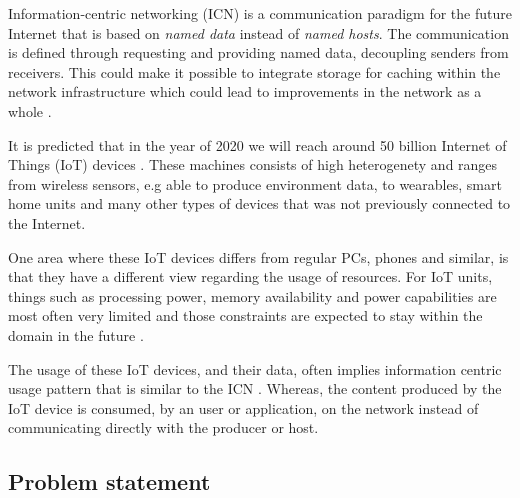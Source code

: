 Information-centric networking (ICN) is a communication paradigm for the future Internet that is based on \textit{named data} instead of \textit{named hosts}. The communication is defined through requesting and providing named data, decoupling senders from receivers. This could make it possible to integrate storage for caching within the network infrastructure which could lead to improvements in the network as a whole \cite{Ahlgren2012}.

It is predicted that in the year of 2020 we will reach around 50 billion Internet of Things (IoT) devices \cite{alanCarlton}. These machines consists of high heterogenety and ranges from wireless sensors, e.g able to produce environment data, to wearables, smart home units and many other types of devices that was not previously connected to the Internet.

One area where these IoT devices differs from regular PCs, phones and similar, is that they have a different view regarding the usage of resources. For IoT units, things such as processing power, memory availability and power capabilities are most often very limited and those constraints are expected to stay within the domain in the future \cite{chipmakersarebetting}.

The usage of these IoT devices, and their data, often implies information centric usage pattern that is similar to the ICN \cite{Ahlgreniot}. Whereas, the content produced by the IoT device is consumed, by an user or application, on the network instead of communicating directly with the producer or host.



\subsection{Problem statement}

